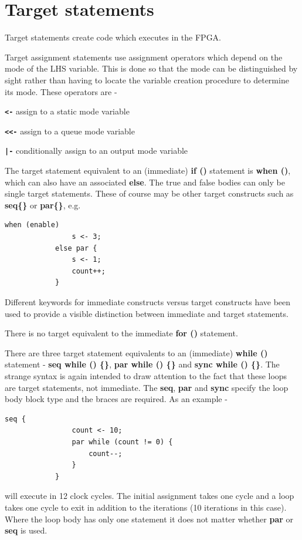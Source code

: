     \section{Target statements}

        Target statements create code which executes in the FPGA.

        Target assignment statements use assignment operators which depend on the
        mode of the LHS variable. This is done so that the mode can be distinguished
        by sight rather than having to locate the variable creation procedure to
        determine its mode. These operators are -

        \blist
        \item   {\bf \verb'<-'} assign to a static mode variable
        \item   {\bf \verb'<<-'} assign to a queue mode variable
        \item   {\bf \verb'|-'} conditionally assign to an output mode variable
        \blend

        The target statement equivalent to an (immediate) {\bf if ()} statement
        is {\bf when ()}, which can also have an associated {\bf else}. The true and
        false bodies can only be single target statements. These of course may
        be other target constructs such as {\bf seq\{\}} or {\bf par\{\}}, e.g.
        \begin{lstlisting}[language=threepl]
            when (enable)
                s <- 3;
            else par {
                s <- 1;
                count++;
            }
        \end{lstlisting}
        Different keywords for immediate constructs versus target constructs have
        been used to provide a visible distinction between immediate and target
        statements.

        There is no target equivalent to the immediate {\bf for ()} statement.

        There are three target statement equivalents to an (immediate) {\bf while ()}
        statement - {\bf seq while () \{\}}, {\bf par while () \{\}} and
        {\bf sync while () \{\}}. The strange syntax is again intended to draw
        attention to the fact that these loops are target statements, not immediate.
        The {\bf seq}, {\bf par} and {\bf sync} specify the loop body block type and
        the braces are required. As an example -
        \begin{lstlisting}[language=threepl]
            seq {
                count <- 10;
                par while (count != 0) {
                    count--;
                }
            }
        \end{lstlisting}
        will execute in 12 clock cycles. The initial assignment takes one cycle
        and a loop takes one cycle to exit in addition to the iterations (10
        iterations in this case). Where the loop body has only one statement
        it does not matter whether {\bf par} or {\bf seq} is used.

